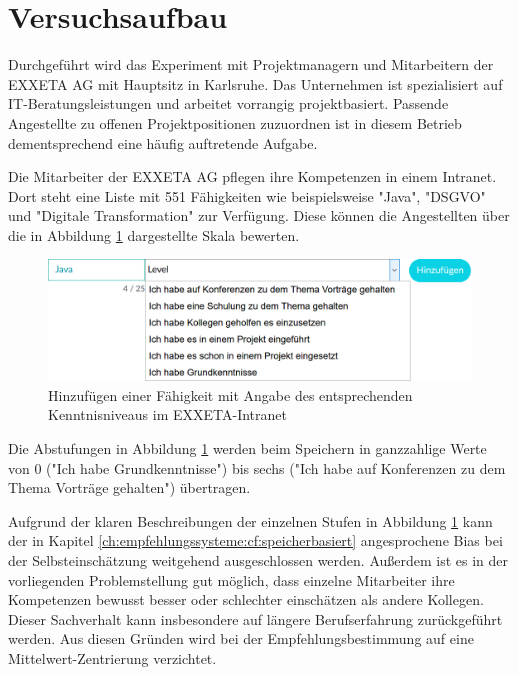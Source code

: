 \section{Versuchsaufbau}
\label{ch:methodik:versuchsaufbau}
Durchgeführt wird das Experiment mit Projektmanagern und Mitarbeitern der EXXETA AG mit Hauptsitz in Karlsruhe. Das Unternehmen ist spezialisiert auf IT-Beratungsleistungen und arbeitet vorrangig projektbasiert. Passende Angestellte zu offenen Projektpositionen zuzuordnen ist in diesem Betrieb dementsprechend eine häufig auftretende Aufgabe.

Die Mitarbeiter der EXXETA AG pflegen ihre Kompetenzen in einem Intranet. Dort steht eine Liste mit 551 Fähigkeiten wie beispielsweise "Java", "DSGVO" und "Digitale Transformation" zur Verfügung. Diese können die Angestellten über die in Abbildung \ref{fig:methodik:versuchsaufbau:daten:abb1} dargestellte Skala bewerten.

\begin{figure}[h]
	\centering
	\includegraphics[width=1\textwidth]{gfx/skill-level.png}
	\caption{Hinzufügen einer Fähigkeit mit Angabe des entsprechenden Kenntnisniveaus im EXXETA-Intranet}
	\label{fig:methodik:versuchsaufbau:daten:abb1}
\end{figure}

Die Abstufungen in Abbildung \ref{fig:methodik:versuchsaufbau:daten:abb1} werden beim Speichern in ganzzahlige Werte von 0 ("Ich habe Grundkenntnisse") bis sechs ("Ich habe auf Konferenzen zu dem Thema Vorträge gehalten") übertragen.

Aufgrund der klaren Beschreibungen der einzelnen Stufen in Abbildung \ref{fig:methodik:versuchsaufbau:daten:abb1} kann der in Kapitel \ref{ch:empfehlungssysteme:cf:speicherbasiert} angesprochene Bias bei der Selbsteinschätzung weitgehend ausgeschlossen werden. Außerdem ist es in der vorliegenden Problemstellung gut möglich, dass einzelne Mitarbeiter ihre Kompetenzen bewusst besser oder schlechter einschätzen als andere Kollegen. Dieser Sachverhalt kann insbesondere auf längere Berufserfahrung zurückgeführt werden. Aus diesen Gründen wird bei der Empfehlungsbestimmung auf eine Mittelwert-Zentrierung verzichtet.

